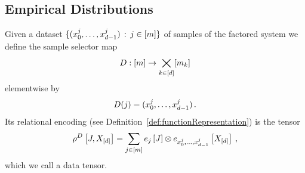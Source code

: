 \subsection{Empirical Distributions}\label{sec:empDistribution}


%
%
%
%
%
%

\begin{definition}\label{def:dataMap}
	Given a dataset $\{({x_{0}^{j},\ldots,x_{d-1}^{j}}) \, : \, j\in[m] \}$ of samples of the factored system we define the sample selector map
		\[ D : [m] \rightarrow \bigtimes_{k\in[d]}[m_{k}] \]
	elementwise by 
		\[ D(j) = ({x_{0}^{j},\ldots,x_{d-1}^{j}}) \, . \]
	Its relational encoding (see Definition~\ref{def:functionRepresentation}) is the tensor
		\[ \rho^{D}\left[J,X_{[d]}\right] = \sum_{j\in[m]} e_{j}\left[J\right] \otimes e_{{x_{0}^{j},\ldots,x_{d-1}^{j}}}\left[X_{[d]}\right] \, , \]
	which we call a data tensor.
\end{definition}

